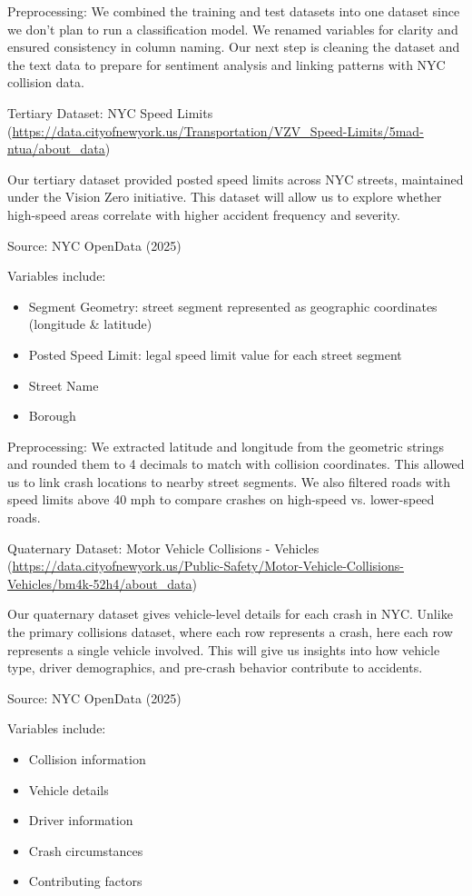 \documentclass[10pt]{article}\usepackage[]{graphicx}\usepackage[]{xcolor}
\begin{document}
Preprocessing: We combined the training and test datasets into one dataset since we don’t plan to run a classification model. We renamed variables for clarity and ensured consistency in column naming. Our next step is cleaning the dataset and the text data to prepare for sentiment analysis and linking patterns with NYC collision data.

Tertiary Dataset: NYC Speed Limits (\url{https://data.cityofnewyork.us/Transportation/VZV_Speed-Limits/5mad-ntua/about_data}) 

Our tertiary dataset provided posted speed limits across NYC streets, maintained under the Vision Zero initiative. This dataset will allow us to explore whether high-speed areas correlate with higher accident frequency and severity.


Source: NYC OpenData (2025)


Variables include:
\begin{itemize}
  \item Segment Geometry: street segment represented as geographic coordinates (longitude & latitude)
  \item Posted Speed Limit: legal speed limit value for each street segment
  \item Street Name
  \item Borough
\end{itemize}

Preprocessing: We extracted latitude and longitude from the geometric strings and rounded them to 4 decimals to match with collision coordinates. This allowed us to link crash locations to nearby street segments. We also filtered roads with speed limits above 40 mph to compare crashes on high-speed vs. lower-speed roads. 

Quaternary Dataset: Motor Vehicle Collisions - Vehicles (\url{https://data.cityofnewyork.us/Public-Safety/Motor-Vehicle-Collisions-Vehicles/bm4k-52h4/about_data}) 

Our quaternary dataset gives vehicle-level details for each crash in NYC. Unlike the primary collisions dataset, where each row represents a crash, here each row represents a single vehicle involved. This will give us insights into how vehicle type, driver demographics, and pre-crash behavior contribute to accidents.

Source: NYC OpenData (2025)


Variables include:
\begin{itemize}
  \item Collision information 
  \item Vehicle details 
  \item Driver information
  \item Crash circumstances 
  \item Contributing factors 
\end{itemize}
\end{document}
